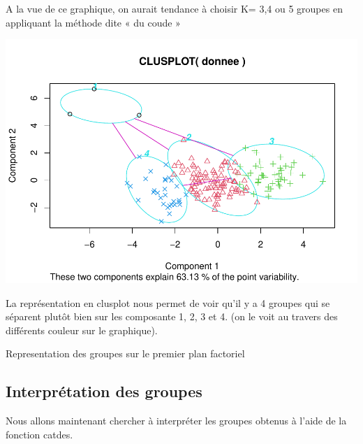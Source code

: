 \documentclass[
]{article}
\newenvironment{Shaded}{}{}
\newcommand{\AttributeTok}[1]{#1}
\newcommand{\DecValTok}[1]{#1}
\newcommand{\FunctionTok}[1]{#1}
\newcommand{\NormalTok}[1]{#1}
\newcommand{\OtherTok}[1]{\textcolor[rgb]{1.00,0.25,0.00}{#1}}
\newcommand{\SpecialCharTok}[1]{\textcolor[rgb]{0.00,0.50,0.50}{#1}}
\begin{document}
A la vue de ce graphique, on aurait tendance à choisir K= 3,4 ou 5
groupes en appliquant la méthode dite « du coude »

\begin{Shaded}
\end{Shaded}

\includegraphics{Projet_files/figure-latex/unnamed-chunk-24-1.pdf}

La représentation en clusplot nous permet de voir qu'il y a 4 groupes
qui se séparent plutôt bien sur les composante 1, 2, 3 et 4. (on le voit
au travers des différents couleur sur le graphique).

Representation des groupes sur le premier plan factoriel

\hypertarget{interpruxe9tation-des-groupes}{%
\subsection{Interprétation des
groupes}\label{interpruxe9tation-des-groupes}}

Nous allons maintenant chercher à interpréter les groupes obtenus à
l'aide de la fonction catdes.

\begin{Shaded}
\end{Shaded}
\end{document}
